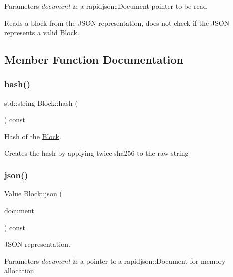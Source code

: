 \begin{DoxyParams}{Parameters}
{\em document} & a rapidjson\+::\+Document pointer to be read\\
\hline
\end{DoxyParams}
Reads a block from the J\+S\+ON representation, does not check if the J\+S\+ON represents a valid \mbox{\hyperlink{classBlock}{Block}}. 

\subsection{Member Function Documentation}
\mbox{\label{classBlock_aee23e922b822767c6e0f1851f8af382f}} 
\subsubsection{\texorpdfstring{hash()}{hash()}}
{\footnotesize\ttfamily std\+::string Block\+::hash (\begin{DoxyParamCaption}{ }\end{DoxyParamCaption}) const}



Hash of the \mbox{\hyperlink{classBlock}{Block}}. 

Creates the hash by applying twice sha256 to the raw string \mbox{\label{classBlock_a9c57b74c726d68e48e96586d3511d19b}} 
\subsubsection{\texorpdfstring{json()}{json()}}
{\footnotesize\ttfamily Value Block\+::json (\begin{DoxyParamCaption}\item[{rapidjson\+::\+Document $\ast$}]{document }\end{DoxyParamCaption}) const}



J\+S\+ON representation. 


\begin{DoxyParams}{Parameters}
{\em document} & a pointer to a rapidjson\+::\+Document for memory allocation \\
\hline
\end{DoxyParams}
\mbox{\label{classBlock_ae69a2e1c0d586541c5633f9d8d4da693}} 
